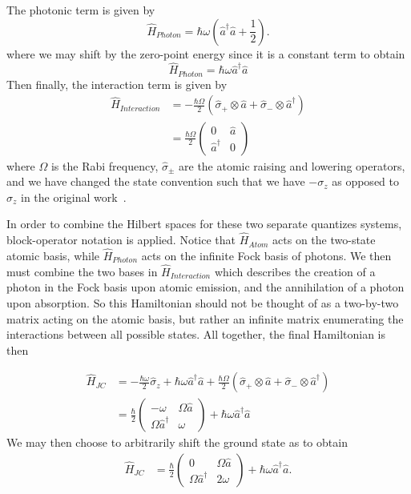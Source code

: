 \documentclass[aps,pra,showpacs,amsmath,amssymb,nofootinbib,longbibliography,superscriptaddress
]{revtex4-1}
\theoremstyle{definition}
\theoremstyle{remark}
\newcommand{\0}{\hat{0}}
\begin{document}
The photonic term is given by
\begin{equation*}
    \hat H_{Photon} = \hbar \omega\left(\hat{a}^{\dagger} \hat{a} + \frac{1}{2}\right).
\end{equation*}
where we may shift by the zero-point energy since it is a constant term to obtain 
\begin{equation*}
    \hat H_{Photon} = \hbar \omega \hat{a}^{\dagger} \hat{a}
\end{equation*}
Then finally, the interaction term is given by
\begin{align}
    \hat H_{Interaction} &= -\frac{\hbar \Omega}{2} \left( \hat{\sigma}_+ \otimes \hat{a} + \hat{\sigma}_- \otimes \hat{a}^{\dagger} \right) \nonumber\\
    &= \frac{\hbar \Omega}{2} \left(\begin{array}{cc}
        0 & \hat{a}\\
        \hat{a}^{\dagger} & 0
    \end{array}\right)
\end{align}
where $\Omega$ is the Rabi frequency, $\hat{\sigma}_{\pm}$ are the atomic raising and lowering operators, and we have changed the state convention such that we have $-\sigma_z$ as opposed to $\sigma_z$ in the original work~\cite{Scala}.

In order to combine the Hilbert spaces for these two separate quantizes systems, block-operator notation is applied. Notice that $\hat H_{Atom}$ acts on the two-state atomic basis, while $\hat H_{Photon}$ acts on the infinite Fock basis of photons. We then must combine the two bases in $\hat H_{Interaction}$ which describes the creation of a photon in the Fock basis upon atomic emission, and the annihilation of a photon upon absorption. So this Hamiltonian should not be thought of as a two-by-two matrix acting on the atomic basis, but rather an infinite matrix enumerating the interactions between all possible states. All together, the final Hamiltonian is then~\cite{Scala}

\begin{align}
    \hat{H}_{JC} &= -\frac{\hbar \omega}{2} \hat \sigma_z + \hbar \omega \hat{a}^{\dagger} \hat{a} + \frac{\hbar \Omega}{2} \left( \hat{\sigma}_+ \otimes \hat{a} + \hat{\sigma}_- \otimes \hat{a}^{\dagger} \right) \nonumber \\
    &= \frac{\hbar}{2} \left(\begin{array}{cc}
        -\omega & \Omega \hat{a}\\
        \Omega \hat{a}^{\dagger} & \omega
    \end{array}\right) + \hbar \omega \hat{a}^{\dagger} \hat{a}
\end{align}
We may then choose to arbitrarily shift the ground state as to obtain
\begin{align}\label{JCMHamiltonian}
    \hat{H}_{JC} &= \frac{\hbar}{2} \left(\begin{array}{cc}
        0 & \Omega \hat{a}\\
        \Omega \hat{a}^{\dagger} & 2\omega
    \end{array}\right) + \hbar \omega \hat{a}^{\dagger} \hat{a}.
\end{align}
\end{document}
